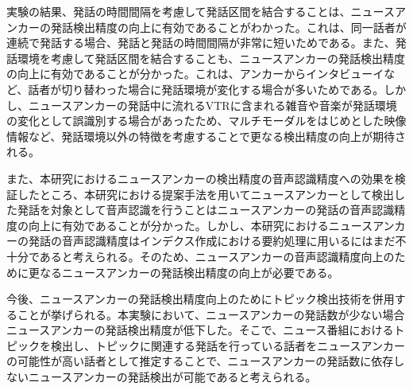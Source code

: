 実験の結果、発話の時間間隔を考慮して発話区間を結合することは、ニュースアンカーの発話検出精度の向上に有効であることがわかった。これは、同一話者が連続で発話する場合、発話と発話の時間間隔が非常に短いためである。また、発話環境を考慮して発話区間を結合することも、ニュースアンカーの発話検出精度の向上に有効であることが分かった。これは、アンカーからインタビューイなど、話者が切り替わった場合に発話環境が変化する場合が多いためである。しかし、ニュースアンカーの発話中に流れるVTRに含まれる雑音や音楽が発話環境の変化として誤識別する場合があったため、マルチモーダルをはじめとした映像情報など、発話環境以外の特徴を考慮することで更なる検出精度の向上が期待される。\par
また、本研究におけるニュースアンカーの検出精度の音声認識精度への効果を検証したところ、本研究における提案手法を用いてニュースアンカーとして検出した発話を対象として音声認識を行うことはニュースアンカーの発話の音声認識精度の向上に有効であることが分かった。しかし、本研究におけるニュースアンカーの発話の音声認識精度はインデクス作成における要約処理に用いるにはまだ不十分であると考えられる。そのため、ニュースアンカーの音声認識精度向上のために更なるニュースアンカーの発話検出精度の向上が必要である。

今後、ニュースアンカーの発話検出精度向上のためにトピック検出技術を併用することが挙げられる。本実験において、ニュースアンカーの発話数が少ない場合ニュースアンカーの発話検出精度が低下した。そこで、ニュース番組におけるトピックを検出し、トピックに関連する発話を行っている話者をニュースアンカーの可能性が高い話者として推定することで、ニュースアンカーの発話数に依存しないニュースアンカーの発話検出が可能であると考えられる。\par
\begin{comment}
また、ニュース番組のインデクシングを実現するためにはニュースアンカーの発話の検出以外に、アンカーの発話内容を推定する必要がある。現在、「発話区間」「発話者」「発話内容」の全てが未知であるとき、ニュースアンカーの発話の音声認識精度はインデックスの作成に十分とは言えない。特に、ニュースアンカーの発話の音声認識精度が低下した理由として、ニュース番組内のVTRの存在がある。本研究で用いた音声認識システムでは雑音や音楽が同時に収録されていた場合、音声認識精度が極端に低下したため、ニュース番組音声から雑音除去を行う、雑音や音楽に頑健な音声認識システムを構築するなどを行う必要があると考えられる。
\end{comment}

\begin{comment}
ニュースアンカーの発話数によって発話の検出精度が低下した理由として、本研究で用いたニュースアンカーの発話検出手法がニュース番組内において、ニュースアンカーの発話が非常に多いことに着目した手法であるためである。このため、発話の少ないニュースアンカーの発話を十分に検出できず、検出精度が低下したと考えられる。\par
\end{comment}

